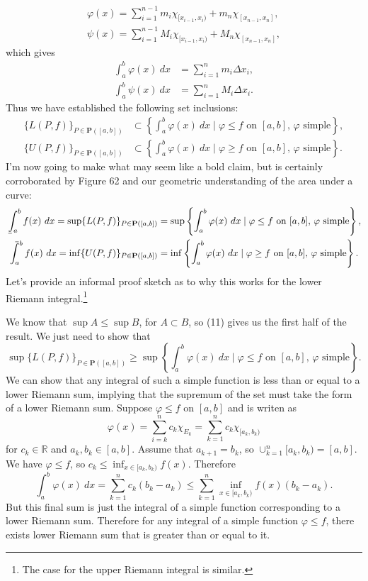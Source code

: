 \documentclass{article}
\def\upint{\mathchoice%
	{\mkern13mu\overline{\vphantom{\intop}\mkern7mu}\mkern-20mu}%
	{\mkern7mu\overline{\vphantom{\intop}\mkern7mu}\mkern-14mu}%
	{\mkern7mu\overline{\vphantom{\intop}\mkern7mu}\mkern-14mu}%
	{\mkern7mu\overline{\vphantom{\intop}\mkern7mu}\mkern-14mu}%
	\int}
\def\lowint{\mkern3mu\underline{\vphantom{\intop}\mkern7mu}\mkern-10mu\int}
\newcommand{\R}{\mathbb{R}}
\theoremstyle{definition}
\begin{document}
	\begin{align*}
		\varphi(x)=\sum_{i=1}^{n-1}m_i\chi_{[x_{i-1},x_i)}+m_n\chi_{[x_{n-1},x_n]},\\\psi(x)=\sum_{i=1}^{n-1}M_i\chi_{[x_{i-1},x_i)}+M_n\chi_{[x_{n-1},x_n]},
	\end{align*} 
	which gives
	\begin{align*}
		\int_{a}^{b}\varphi(x)\ dx&=\sum_{i=1}^nm_i\Delta x_i,\\
		\int_{a}^{b}\psi(x)\ dx&=\sum_{i=1}^nM_i\Delta x_i.	
	\end{align*}
	Thus we have established the following set inclusions:
	\begin{align}
		\{L(P,f)\}_{P\in\textbf{P}([a,b])}&\subset \left\{\int_a^b\varphi(x)\ dx\mid \varphi\le f\text{ on }[a,b]\text{, } \varphi\text{ simple}\right\},\\
		\{U(P,f)\}_{P\in\textbf{P}([a,b])}&\subset \left\{\int_a^b\varphi(x)\ dx\mid \varphi\ge f\text{ on }[a,b]\text{, } \varphi\text{ simple}\right\}.
	\end{align} 
	I'm now going to make what may seem like a bold claim, but is certainly corroborated by Figure 62 and our geometric understanding of the area under a curve:
	\begin{align*}
		\lowint_a^b f(x)\ dx=\sup\{L(P,f)\}_{P\in\textbf{P}([a,b])}&=\sup \left\{\int_a^b\varphi(x)\ dx\mid \varphi\le f\text{ on }[a,b]\text{, } \varphi\text{ simple}\right\},\\
		\upint_a^b f(x)\ dx=\inf\{U(P,f)\}_{P\in\textbf{P}([a,b])}&=\inf\left\{\int_a^b\varphi(x)\ dx\mid \varphi\ge f\text{ on }[a,b]\text{, } \varphi\text{ simple}\right\}.
	\end{align*} 
	Let's provide an informal proof sketch as to why this works for the lower Riemann integral.\footnote{The case for the upper Riemann integral is similar.}
	
	We know that $ \sup A\le \sup B $, for $ A\subset B $, so (11) gives us the first half of the result. We just need to show that
	$$\sup\{L(P,f)\}_{P\in\textbf{P}([a,b])}\ge\sup \left\{\int_a^b\varphi(x)\ dx\mid \varphi\le f\text{ on }[a,b]\text{, } \varphi\text{ simple}\right\} .$$ We can show that any integral of such a simple function is less than or equal to a lower Riemann sum, implying that the supremum of the set must take the form of a lower Riemann sum. Suppose $ \varphi\le f$ on $ [a,b]  $ and is writen as $$\varphi(x)=\sum_{i=k}^{n}c_k\chi_{E_k}=\sum_{k=1}^{n}c_k\chi_{[a_k,b_k)} $$ for $ c_k\in\R $ and $ a_k,b_k\in [a,b] $. Assume that $ a_{k+1}=b_{k} $, so $ \cup_{k=1}^n[a_k,b_k)=[a,b] $. We have $ \varphi\le f $, so $ c_k\le\inf_{x\in[a_k,b_k)}f(x) $. Therefore 
	$$\int_{a}^{b}\varphi(x)\ dx=\sum_{k=1}^{n}c_k(b_k-a_k)\le \sum_{k=1}^{n} \inf\limits_{x\in[a_k,b_k)}f(x)(b_k-a_k) .$$ But this final sum is just the integral of a simple function corresponding to a lower Riemann sum. Therefore for any integral of a simple function $ \varphi\le f $, there exists lower Riemann sum that is greater than or equal to it. 
	
\end{document}

